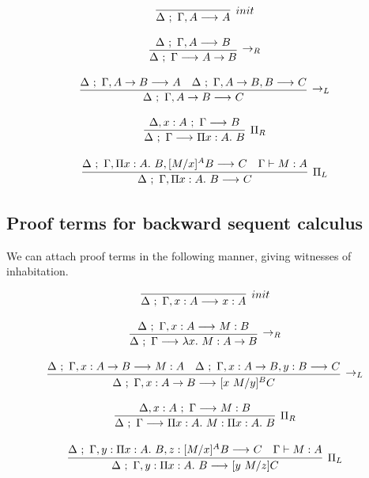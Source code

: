 \documentclass[11pt,twoside]{article}
\begin{document}
$$
\begin{array}{c}
\infer[init]{\Sequent{\Delta}{\Gamma,A}{A}}{} \\\\
\infer[\LFArr_R]{\Sequent{\Delta}{\Gamma}{A\LFArr B}}
                {\Sequent{\Delta}{\Gamma,A}{B}} \\\\
\infer[\LFArr_L]{\Sequent{\Delta}{\Gamma,A\LFArr B}{C}}
                {\Sequent{\Delta}{\Gamma,A\LFArr B}{A} & 
                 \Sequent{\Delta}{\Gamma,A\LFArr B,B}{C}}\\\\
\infer[\Pi_R]{\Sequent{\Delta}{\Gamma}{\PiTyp{x}{A}{B}}}
             {\Sequent{\Delta,x:A}{\Gamma}{B}} \\\\
\infer[\Pi_L]{\Sequent{\Delta}{\Gamma,\PiTyp{x}{A}{B}}{C}}
             {\Sequent{\Delta}{\Gamma,\PiTyp{x}{A}{B},\HSub{M}{x}{A}{B}}{C} & 
              \Gamma \vdash M : A}
\end{array} 
$$

\subsection{Proof terms for backward sequent calculus}

  We can attach proof terms in the following manner, giving
witnesses of inhabitation.

$$
\begin{array}{c}
\infer[init]{\Sequent{\Delta}{\Gamma,x:A}{x:A}}{} \\\\
\infer[\LFArr_R]{\Sequent{\Delta}{\Gamma}{\Lam{x}{M} : A\LFArr B}}
                {\Sequent{\Delta}{\Gamma,x:A}{M:B}} \\\\
\infer[\LFArr_L]{\Sequent{\Delta}{\Gamma,x:A\LFArr B}{\HSub{x\ M}{y}{B}{C}}}
                {\Sequent{\Delta}{\Gamma,x:A\LFArr B}{M:A} & 
                 \Sequent{\Delta}{\Gamma,x:A\LFArr B,y:B}{C}}\\\\
\infer[\Pi_R]{\Sequent{\Delta}{\Gamma}{\PiTyp{x}{A}{M}:\PiTyp{x}{A}{B}}}
             {\Sequent{\Delta,x:A}{\Gamma}{M:B}} \\\\
\infer[\Pi_L]{\Sequent{\Delta}{\Gamma,y : \PiTyp{x}{A}{B}}{[y\ M/z] C}}
             {\Sequent{\Delta}{\Gamma,y : \PiTyp{x}{A}{B},z : \HSub{M}{x}{A}{B}}{C} &
              \Gamma \vdash M : A}
\end{array} 
$$
\end{document}
